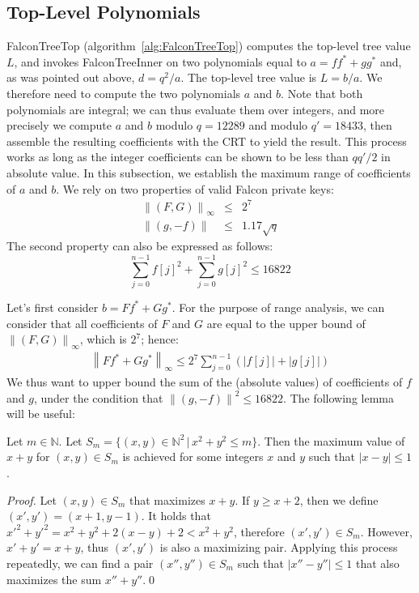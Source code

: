 \documentclass{llncs}
\newcommand{\bN}{\mathbb{N}}
\newcommand{\norm}[1]{\left\|#1\right\|}
\newcommand{\norminf}[1]{\norm{#1}_{\infty}}
\newcommand{\adj}[1]{{#1}^*}
\begin{document}
\subsection{Top-Level Polynomials}\label{toplevel-range}

\textsf{FalconTreeTop} (algorithm~\ref{alg:FalconTreeTop}) computes the
top-level tree value $L$, and invokes \textsf{FalconTreeInner} on two
polynomials equal to $a = f\adj{f} + g\adj{g}$ and, as was pointed out
above, $d = q^2/a$. The top-level tree value is $L = b/a$. We therefore
need to compute the two polynomials $a$ and $b$. Note that both
polynomials are integral; we can thus evaluate them over integers, and
more precisely we compute $a$ and $b$ modulo $q = 12289$ and modulo $q'
= 18433$, then assemble the resulting coefficients with the CRT to yield
the result. This process works as long as the integer coefficients can
be shown to be less than $qq'/2$ in absolute value. In this subsection,
we establish the maximum range of coefficients of $a$ and $b$. We rely
on two properties of valid Falcon private keys:
\begin{eqnarray*}
    \norminf{(F,G)} &\leq& 2^7 \\
    \norm{(g, -f)} &\leq& 1.17\sqrt{q}
\end{eqnarray*}
The second property can also be expressed as follows:
\begin{equation*}
    \sum_{j=0}^{n-1} f[j]^2 + \sum_{j=0}^{n-1} g[j]^2 \leq 16822
\end{equation*}

Let's first consider $b = F\adj{f} + G\adj{g}$. For the purpose of range
analysis, we can consider that all coefficients of $F$ and $G$ are equal
to the upper bound of $\norminf{(F, G)}$, which is $2^7$; hence:
\begin{eqnarray*}
    \norminf{F\adj{f} + G\adj{g}} \leq 2^7 \sum_{j=0}^{n-1} (|f[j]| + |g[j]|)
\end{eqnarray*}
We thus want to upper bound the sum of the (absolute values) of
coefficients of $f$ and $g$, under the condition that
$\norm{(g,-f)}^2 \leq 16822$. The following lemma will be useful:

\begin{lemma}\label{lemma:max-sum}
Let $m \in\bN$. Let $S_m = \{ (x, y)\in\bN^2 \,|\, x^2 + y^2 \leq m \}$.
Then the maximum value of $x + y$ for $(x, y)\in S_m$ is achieved for some
integers $x$ and $y$ such that $|x - y|\leq 1$.
\end{lemma}
\begin{proof}
Let $(x, y)\in S_m$ that maximizes $x + y$. If $y \geq x + 2$, then we
define $(x', y') = (x + 1, y - 1)$. It holds that
$x'^2 + y'^2 = x^2 + y^2 + 2(x - y) + 2 < x^2 + y^2$,
therefore $(x', y')\in S_m$. However, $x' + y' = x + y$, thus $(x', y')$
is also a maximizing pair. Applying this process repeatedly, we can find
a pair $(x'', y'')\in S_m$ such that $|x'' - y''| \leq 1$ that
also maximizes the sum $x'' + y''$.\qed
\end{proof}
\end{document}
